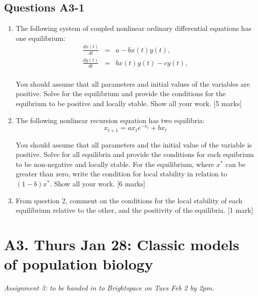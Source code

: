 \documentclass[]{book}
\begin{document}
\section{Questions A3-1}\label{questions-a3-1}

\begin{enumerate}
\def\labelenumi{\arabic{enumi}.}
\item
  The following system of coupled nonlinear ordinary differential
  equations has one equilibrium:\\

  \begin{eqnarray}
  \frac{dx(t)}{dt} & = & a - bx(t)y(t),\\
  \frac{dy(t)}{dt} & = & bx(t)y(t) - cy(t),\\
  \end{eqnarray}

  You should assume that all parameters and initial values of the
  variables are positive. Solve for the equilibrium and provide the
  conditions for the equibrium to be positive and locally stable. Show
  all your work. {[}5 marks{]}\\
\item
  The following nonlinear recursion equation has two equilibria:\\

  \begin{equation}
  x_{t+1} = a x_t e^{-x_t}+bx_t
  \end{equation}

  You should assume that all parameters and the initial value of the
  variable is positive. Solve for all equilibria and provide the
  conditions for each equibrium to be non-negative and locally stable.
  For the equilibrium, where \(x^*\) can be greater than zero, write the
  condition for local stability in relation to \((1-b)x^*\). Show all
  your work. {[}6 marks{]}
\item
  From question 2, comment on the conditions for the local stability of
  each equilibrium relative to the other, and the positivity of the
  equilibria. {[}1 mark{]}
\end{enumerate}

\chapter{A3. Thurs Jan 28: Classic models of population
biology}\label{a3.-thurs-jan-28-classic-models-of-population-biology}

\emph{Assignment 3: to be handed in to Brightspace on Tues Feb 2 by
2pm.}
\end{document}
